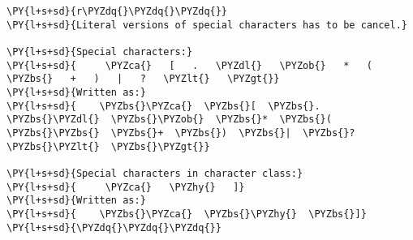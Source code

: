

\section*{}

\begin{Verbatim}[commandchars=\\\{\}]
\PY{l+s+sd}{r\PYZdq{}\PYZdq{}\PYZdq{}}
\PY{l+s+sd}{Literal versions of special characters has to be cancel.}

\PY{l+s+sd}{Special characters:}
\PY{l+s+sd}{     \PYZca{}   [   .   \PYZdl{}   \PYZob{}   *   (   \PYZbs{}   +   )   |   ?   \PYZlt{}   \PYZgt{}}
\PY{l+s+sd}{Written as:}
\PY{l+s+sd}{    \PYZbs{}\PYZca{}  \PYZbs{}[  \PYZbs{}.  \PYZbs{}\PYZdl{}  \PYZbs{}\PYZob{}  \PYZbs{}*  \PYZbs{}(  \PYZbs{}\PYZbs{}  \PYZbs{}+  \PYZbs{})  \PYZbs{}|  \PYZbs{}?  \PYZbs{}\PYZlt{}  \PYZbs{}\PYZgt{}}

\PY{l+s+sd}{Special characters in character class:}
\PY{l+s+sd}{     \PYZca{}   \PYZhy{}   ]}
\PY{l+s+sd}{Written as:}
\PY{l+s+sd}{    \PYZbs{}\PYZca{}  \PYZbs{}\PYZhy{}  \PYZbs{}]}
\PY{l+s+sd}{\PYZdq{}\PYZdq{}\PYZdq{}}
\end{Verbatim}
